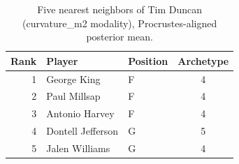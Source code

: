 \begin{table}[htbp]
  \centering\small
  \begin{tabular}{rllc}
    \toprule
    Rank & Player & Position & Archetype \\
    \midrule
    1 & George King & F & 4 \\
    2 & Paul Millsap & F & 4 \\
    3 & Antonio Harvey & F & 4 \\
    4 & Dontell Jefferson & G & 5 \\
    5 & Jalen Williams & G & 4 \\
    \bottomrule
  \end{tabular}
  \caption{Five nearest neighbors of Tim Duncan (curvature_m2 modality), Procrustes-aligned posterior mean.}
  \label{tab:Tim_Duncan_neighbors_curvature_m2}
\end{table}

